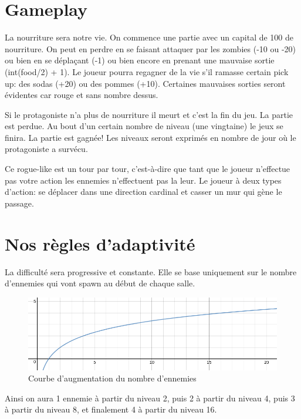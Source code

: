 \documentclass[onecolumn, 12pt]{article}
\begin{document}
\section{Gameplay}\label{gameplay}

La nourriture sera notre vie. On commence une partie avec un capital de
100 de nourriture. On peut en perdre en se faisant attaquer par les
zombies (-10 ou -20) ou bien en se déplaçant (-1) ou bien encore en
prenant une mauvaise sortie (int(food/2) + 1). Le joueur pourra regagner
de la vie s'il ramasse certain pick up: des sodas (+20) ou des pommes
(+10). Certaines mauvaises sorties seront évidentes car rouge et sans
nombre dessus.

Si le protagoniste n'a plus de nourriture il meurt et c'est la fin du
jeu. La partie est perdue. Au bout d'un certain nombre de niveau (une
vingtaine) le jeux se finira. La partie est gagnée! Les niveaux seront
exprimés en nombre de jour où le protagoniste a survécu.

Ce rogue-like est un tour par tour, c'est-à-dire que tant que le joueur
n'effectue pas votre action les ennemies n'effectuent pas la leur. Le
joueur à deux types d'action: se déplacer dans une direction cardinal et
casser un mur qui gène le passage.

\section{Nos règles
d'adaptivité}\label{nos-ruxe8gles-dadaptivituxe9}

La difficulté sera progressive et constante. Elle se base uniquement sur
le nombre d'ennemies qui vont spawn au début de chaque salle.
\begin{center}
\begin{figure}
   \caption{\label{difficulty} Courbe d'augmentation du nombre d'ennemies}
   \includegraphics[scale=0.45]{../img/difficulty.png}
\end{figure}
\end{center}


Ainsi on aura 1 ennemie à partir du niveau 2, puis 2 à partir du niveau
4, puis 3 à partir du niveau 8, et finalement 4 à partir du niveau 16.
\end{document}
